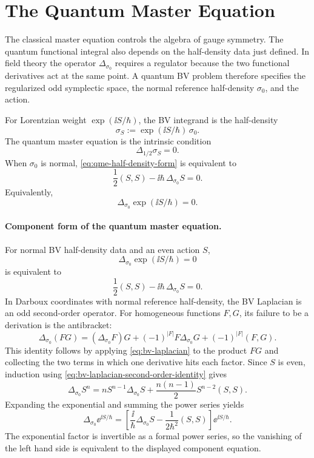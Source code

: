 \section{The Quantum Master Equation}

The classical master equation controls the algebra of gauge symmetry.  The
quantum functional integral also depends on the half-density data just
defined.  In field theory the operator \(\Delta_{\sigma_0}\) requires a
regulator because the two functional derivatives act at the same point.  A
quantum BV problem therefore specifies the regularized odd symplectic space,
the normal reference half-density \(\sigma_0\), and the action.

\begin{definition}
For Lorentzian weight \(\exp(\ii S/\hbar)\), the BV integrand is the
half-density
\[
  \sigma_S
  :=
  \exp(\ii S/\hbar)\,\sigma_0 .
\]
The quantum master equation is the intrinsic condition
\begin{equation}
  \Delta_{1/2}\sigma_S=0 .
  \label{eq:qme-half-density-form}
\end{equation}
When \(\sigma_0\) is normal, \eqref{eq:qme-half-density-form} is equivalent to
\begin{equation}
  \frac12(S,S)-\ii\hbar\,\Delta_{\sigma_0}S=0.
  \label{eq:quantum-master-equation}
\end{equation}
Equivalently,
\[
  \Delta_{\sigma_0}\exp(\ii S/\hbar)=0.
\]
\end{definition}

\paragraph{Component form of the quantum master equation.}
For normal BV half-density data and an even action \(S\),
\[
  \Delta_{\sigma_0}\exp(\ii S/\hbar)=0
\]
is equivalent to
\[
  \frac12(S,S)-\ii\hbar\,\Delta_{\sigma_0}S=0 .
\]
In Darboux coordinates with normal reference half-density, the BV Laplacian
is an odd second-order operator.  For homogeneous functions \(F,G\), its
failure to be a derivation is the antibracket:
\begin{equation}
  \Delta_{\sigma_0}(FG)
  =
  (\Delta_{\sigma_0}F)G
  +
  (-1)^{|F|}F\Delta_{\sigma_0}G
  +
  (-1)^{|F|}(F,G).
  \label{eq:bv-laplacian-second-order-identity}
\end{equation}
This identity follows by applying
\eqref{eq:bv-laplacian} to the product \(FG\) and collecting the two
terms in which one derivative hits each factor.  Since \(S\) is even,
induction using \eqref{eq:bv-laplacian-second-order-identity} gives
\begin{equation}
  \Delta_{\sigma_0}S^n
  =
  nS^{n-1}\Delta_{\sigma_0}S
  +
  \frac{n(n-1)}{2}S^{n-2}(S,S).
  \label{eq:bv-laplacian-power-even-action}
\end{equation}
Expanding the exponential and summing the power series yields
\[
  \Delta_{\sigma_0}\ee^{\ii S/\hbar}
  =
  \left[
    \frac{\ii}{\hbar}\Delta_{\sigma_0}S
    -
    \frac{1}{2\hbar^2}(S,S)
  \right]\ee^{\ii S/\hbar}.
\]
The exponential factor is invertible as a formal power series, so the
vanishing of the left hand side is equivalent to the displayed component
equation.


